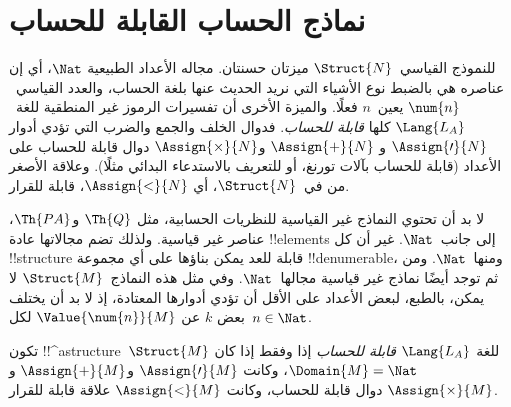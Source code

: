 \documentclass[../../../include/open-logic-section]{subfiles}
\begin{document}
\section{نماذج الحساب القابلة للحساب}

\begin{explain}
للنموذج القياسي~$\Struct{N}$ ميزتان حسنتان. مجاله الأعداد الطبيعية
$\Nat$، أي إن عناصره هي بالضبط نوع الأشياء التي نريد الحديث عنها بلغة
الحساب، والعدد القياسي~$\num{n}$ يعين~$n$ فعلًا. والميزة الأخرى أن
تفسيرات الرموز غير المنطقية للغة~$\Lang{L_A}$ كلها \emph{قابلة للحساب}.
فدوال الخلف والجمع والضرب التي تؤدي أدوار $\Assign{\prime}{N}$ و
$\Assign{+}{N}$ و$\Assign{\times}{N}$ دوال قابلة للحساب على الأعداد
(قابلة للحساب بآلات تورنغ، أو للتعريف بالاستدعاء البدائي مثلًا). وعلاقة
الأصغر من في~$\Struct{N}$، أي $\Assign{<}{N}$، قابلة للقرار.

لا بد أن تحتوي النماذج غير القياسية للنظريات الحسابية، مثل $\Th{Q}$
و$\Th{PA}$، عناصر غير قياسية. ولذلك تضم مجالاتها عادة !!{element}s إلى
جانب~$\Nat$. غير أن كل !!{structure} قابلة للعد يمكن بناؤها على أي
مجموعة !!{denumerable}، ومنها~$\Nat$. ومن ثم توجد أيضًا نماذج غير
قياسية مجالها~$\Nat$. وفي مثل هذه النماذج~$\Struct{M}$ لا يمكن، بالطبع،
لبعض الأعداد على الأقل أن تؤدي أدوارها المعتادة، إذ لا بد أن يختلف بعض
$k$ عن $\Value{\num{n}}{M}$ لكل~$n \in \Nat$.
\end{explain}

\begin{defn}
تكون !!^a{structure}~$\Struct{M}$ للغة $\Lang{L_A}$ \emph{قابلة
للحساب} إذا وفقط إذا كان $\Domain{M}=\Nat$، وكانت
$\Assign{\prime}{M}$ و$\Assign{+}{M}$ و$\Assign{\times}{M}$ دوال قابلة
للحساب، وكانت $\Assign{<}{M}$ علاقة قابلة للقرار.
\end{defn}
\end{document}
